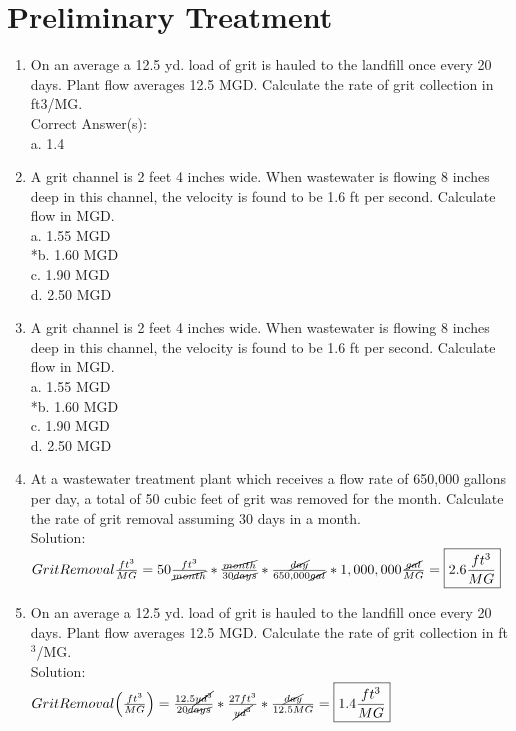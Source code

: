 \section*{Preliminary Treatment} 
\begin{enumerate}
\item On an average a 12.5 yd. load of grit is hauled to the landfill once every 20 days. Plant flow averages 12.5 MGD. Calculate the rate of grit collection in ft3/MG. \\

Correct Answer(s):\\
a. 1.4

\vspace{0.4cm}
\item A grit channel is 2 feet 4 inches wide. When wastewater is flowing 8 inches deep in this channel, the velocity is found to be 1.6 ft per second. Calculate flow in MGD. \\

a. 1.55 MGD \\
*b. 1.60 MGD \\
c. 1.90 MGD \\
d. 2.50 MGD 

\vspace{0.4cm}
\item A grit channel is 2 feet 4 inches wide. When wastewater is flowing 8 inches deep in this channel, the velocity is found to be 1.6 ft per second. Calculate flow in MGD. \\

a. 1.55 MGD \\
*b. 1.60 MGD \\
c. 1.90 MGD \\
d. 2.50 MGD 



\vspace{0.4cm}
\item At a wastewater treatment plant which receives a flow rate of 650,000 gallons per day, a total of 50 cubic feet of grit was removed for the month. Calculate the rate of grit removal assuming 30 days in a month.\\
Solution:\\
$Grit Removal\frac{ft^3}{MG}=50\frac{ft^3}{ \cancel{month}}*\frac{\cancel{month}}{30\cancel{days}}*\frac{\cancel{day}}{650,000\cancel{gal}}*1,000,000\frac{\cancel{gal}}{MG}=\boxed{2.6\frac{ft^3}{MG}}$

\vspace{0.4cm}
\item On an average a 12.5 yd. load of grit is hauled to the landfill once every 20 days. Plant flow averages 12.5 MGD. Calculate the rate of grit collection in ft$^3$/MG.\\
Solution:\\
$Grit Removal\Big(\frac{ft^3}{MG}\Big)=\frac{12.5\cancel{yd^3}}{ 20\cancel{days}}*\frac{27ft^3}{ \cancel{yd^3}}*\frac{\cancel{day}}{12.5MG}=\boxed{1.4\frac{ft^3}{MG}}$


\end{enumerate}
